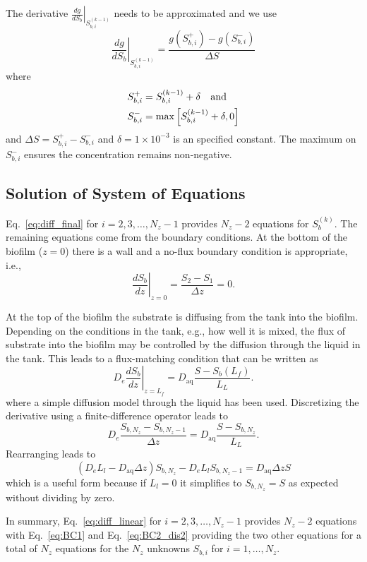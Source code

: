 \documentclass[letterpaper, twoside]{article}
\newcommand{\eg}{e.g.}
\newcommand{\ie}{i.e.}
\begin{document}
The derivative $\left.\frac{d g}{d S_b}\right|_{S_{b,i}^{(k-1)}}$ needs to be approximated and we use
\begin{equation}
  \label{eq:dgds}
  \left.\frac{d g}{d S_b}\right|_{S_{b,i}^{(k-1)}} = \frac{g\left(S_{b,i}^+\right) - g\left(S_{b,i}^{-}\right)}{\Delta S}
\end{equation}
where
\begin{align*}
  S_{b,i}^+&=S_{b,i}^{(k-1)}+\delta \text{\quad and} \\
  S_{b,i}^-&=\max\left[S_{b,i}^{(k-1)}+\delta,0\right]
\end{align*}
and $\Delta S = S_{b,i}^+ - S_{b,i}^-$ and $\delta=1\times 10^{-3}$ is an specified constant.  The maximum on $S_{b,i}^-$ ensures the concentration remains non-negative.

\subsection{Solution of System of Equations}
Eq.~\ref{eq:diff_final} for $i=2,3,\dots,N_z-1$ provides $N_z-2$ equations for $S_{b}^{(k)}$.  The remaining equations come from the boundary conditions.  At the bottom of the biofilm ($z=0$) there is a wall and a no-flux boundary condition is appropriate, \ie,
\begin{equation}
  \label{eq:BC1}
  \left.\frac{d S_b}{dz}\right|_{z=0}= \frac{S_2 - S_1}{\Delta z} =0.
\end{equation}

At the top of the biofilm the substrate is diffusing from the tank into the biofilm.  Depending on the conditions in the tank, \eg, how well it is mixed, the flux of substrate into the biofilm may be controlled by the diffusion through the liquid in the tank.  This leads to a flux-matching condition that can be written as
\begin{equation}
  \label{eq:BC2}
  D_e \left.\frac{d S_b}{dz}\right|_{z=L_f} = D_{\mathrm{aq}} \frac{S - S_b(L_f)}{L_L}.
\end{equation}
where a simple diffusion model through the liquid has been used.  Discretizing the derivative using a finite-difference operator leads to
\begin{equation}
  \label{eq:BC2_dis}
  D_e \frac{S_{b,N_z} - S_{b,N_z-1}}{\Delta z} = D_{\mathrm{aq}} \frac{S - S_{b,N_z}}{L_L}.
\end{equation}
Rearranging leads to
\begin{equation}
  \label{eq:BC2_dis2}
  \left(D_e L_l - D_{\mathrm{aq}} \Delta z\right) S_{b,N_z} - D_e L_l S_{b,N_z-1} = D_{\mathrm{aq}} \Delta z S
\end{equation}
which is a useful form because if $L_l=0$ it simplifies to $S_{b,N_z}=S$ as expected without dividing by zero.

In summary, Eq.~\ref{eq:diff_linear} for $i=2,3,\dots,N_z-1$ provides $N_z-2$ equations with Eq.~\ref{eq:BC1} and Eq.~\ref{eq:BC2_dis2} providing the two other equations for a total of $N_z$ equations for the $N_z$ unknowns $S_{b,i}$ for $i=1,\dots,N_z$.
\end{document}
